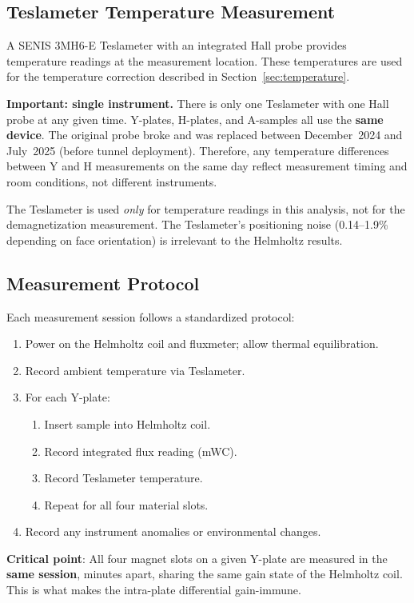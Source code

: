 \documentclass[11pt,letterpaper]{article}
\begin{document}
\subsection{Teslameter Temperature Measurement}

A SENIS 3MH6-E Teslameter with an integrated Hall probe provides temperature
readings at the measurement location. These temperatures are used for the
temperature correction described in Section~\ref{sec:temperature}.

\textbf{Important: single instrument.} There is only one Teslameter with one
Hall probe at any given time. Y-plates, H-plates, and A-samples all use the
\textbf{same device}. The original probe broke and was replaced between
December~2024 and July~2025 (before tunnel deployment). Therefore, any
temperature differences between Y and H measurements on the same day reflect
measurement timing and room conditions, not different instruments.

The Teslameter is used \emph{only} for temperature readings in this analysis,
not for the demagnetization measurement. The Teslameter's positioning noise
(0.14--1.9\% depending on face orientation) is irrelevant to the Helmholtz
results.

\subsection{Measurement Protocol}

Each measurement session follows a standardized protocol:
\begin{enumerate}
    \item Power on the Helmholtz coil and fluxmeter; allow thermal equilibration.
    \item Record ambient temperature via Teslameter.
    \item For each Y-plate:
    \begin{enumerate}
        \item Insert sample into Helmholtz coil.
        \item Record integrated flux reading (mWC).
        \item Record Teslameter temperature.
        \item Repeat for all four material slots.
    \end{enumerate}
    \item Record any instrument anomalies or environmental changes.
\end{enumerate}

\textbf{Critical point}: All four magnet slots on a given Y-plate are measured
in the \textbf{same session}, minutes apart, sharing the same gain state of the
Helmholtz coil. This is what makes the intra-plate differential gain-immune.
\end{document}

